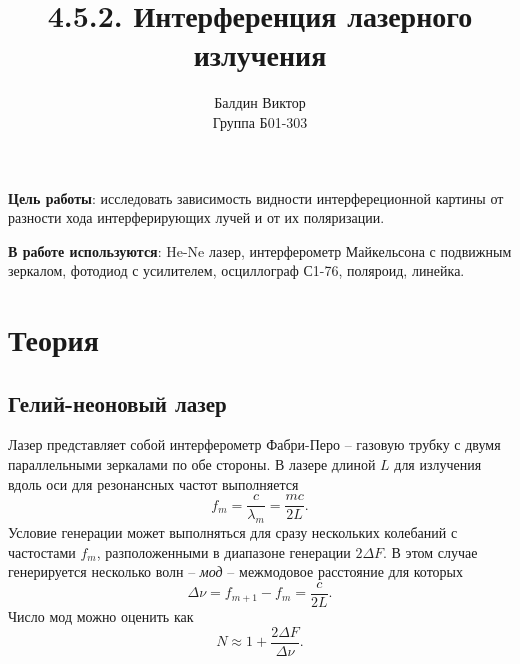 \documentclass[a4paper,12pt]{article}
\author{Балдин Виктор\\
Группа Б01-303}
\title{4.5.2. Интерференция лазерного излучения}
\date{}
\begin{document}
\maketitle
\textbf{Цель работы}: исследовать зависимость видности интерфереционной картины от разности хода интерферирующих лучей и от их поляризации.


\textbf{В работе используются}: He-Ne лазер, интерферометр Майкельсона с подвижным зеркалом, фотодиод с усилителем, осциллограф С1-76, поляроид, линейка.
\section*{Теория}
\subsection*{Гелий-неоновый лазер}
Лазер представляет собой интерферометр Фабри-Перо -- газовую трубку с двумя параллельными зеркалами по обе стороны. В лазере длиной $L$ для излучения вдоль оси для резонансных частот выполняется
\begin{equation}
f_m = \dfrac{c}{\lambda_m} = \dfrac{mc}{2L}.
\end{equation}
Условие генерации может выполняться для сразу нескольких колебаний с частостами $f_m$, разположенными в диапазоне генерации $2\Delta F$. В этом случае генерируется несколько волн -- \textit{мод} -- межмодовое расстояние для которых
\begin{equation}
\Delta \nu = f_{m+1} - f_m = \dfrac{c}{2L}.
\end{equation}
Число мод можно оценить как
\begin{equation}
N \approx 1 + \dfrac{2\Delta F}{\Delta \nu}.
\end{equation}
\end{document}
